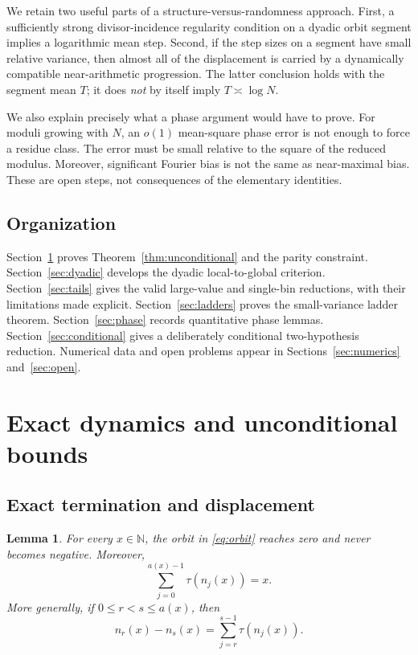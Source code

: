 \documentclass[11pt]{article}
\newtheorem{lemma}[theorem]{Lemma}
\theoremstyle{definition}
\theoremstyle{remark}
\newcommand{\N}{\mathbb{N}}
\begin{document}
We retain two useful parts of a structure-versus-randomness approach.
First, a sufficiently strong divisor-incidence regularity condition on a
dyadic orbit segment implies a logarithmic mean step.  Second, if the
step sizes on a segment have small relative variance, then almost all of
the displacement is carried by a dynamically compatible near-arithmetic
progression.  The latter conclusion holds with the segment mean $T$;
it does \emph{not} by itself imply $T\asymp\log N$.

We also explain precisely what a phase argument would have to prove.
For moduli growing with $N$, an $o(1)$ mean-square phase error is not
enough to force a residue class.  The error must be small relative to the
square of the reduced modulus.  Moreover, significant Fourier bias is
not the same as near-maximal bias.  These are open steps, not consequences
of the elementary identities.

\subsection{Organization}

Section~\ref{sec:exact} proves Theorem~\ref{thm:unconditional} and the
parity constraint.  Section~\ref{sec:dyadic} develops the dyadic
local-to-global criterion.  Section~\ref{sec:tails} gives the valid
large-value and single-bin reductions, with their limitations made
explicit.  Section~\ref{sec:ladders} proves the small-variance ladder
theorem.  Section~\ref{sec:phase} records quantitative phase lemmas.
Section~\ref{sec:conditional} gives a deliberately conditional two-hypothesis
reduction.  Numerical data and open problems appear in
Sections~\ref{sec:numerics} and~\ref{sec:open}.

\section{Exact dynamics and unconditional bounds}\label{sec:exact}

\subsection{Exact termination and displacement}

\begin{lemma}\label{lem:exact-energy}
For every $x\in\N$, the orbit in \eqref{eq:orbit} reaches zero and never
becomes negative.  Moreover,
\begin{equation}\label{eq:exact-energy}
 \sum_{j=0}^{a(x)-1}\tau(n_j(x))=x.
\end{equation}
More generally, if $0\leq r<s\leq a(x)$, then
\begin{equation}\label{eq:segment-energy}
 n_r(x)-n_s(x)=\sum_{j=r}^{s-1}\tau(n_j(x)).
\end{equation}
\end{lemma}
\end{document}
